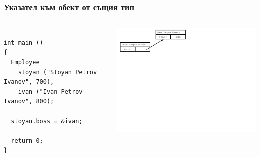 \documentclass{beamer}
\begin{document}
\begin{frame}[fragile]
\frametitle{Указател към обект от същия тип}

\begin{columns}[c]
  \begin{column}{0.55\textwidth}
\begin{flushleft}
\begin{lstlisting}

int main ()
{
  Employee 
    stoyan ("Stoyan Petrov Ivanov", 700),
    ivan ("Ivan Petrov Ivanov", 800);

  stoyan.boss = &ivan;

  return 0;
}

\end{lstlisting}  
\end{flushleft}

  \end{column}
  \begin{column}{0.45\textwidth}
\hspace{-100px}
\includegraphics[width=10.5cm]{images/00_rec_obj_two_objects_linked}

  \end{column}
\end{columns}
\end{frame}
\end{document}

